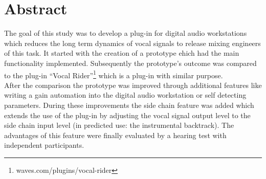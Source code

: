 \chapter*{Abstract}

The goal of this study was to develop a plug-in for digital audio workstations which reduces the long term dynamics of vocal signals to release mixing engineers of this task. It started with the creation of a prototype ehich had the main functionality implemented. Subsequently the prototype's outcome was compared to the plug-in “Vocal Rider”\footnote{waves.com/plugins/vocal-rider} which is a plug-in with similar purpose.\\
After the comparison the prototype was improved through additional features like writing a gain automation into the digital audio workstation or self detecting parameters. During these improvements the side chain feature was added which extends the use of the plug-in by adjusting the vocal signal output level to the side chain input level (in predicted use: the instrumental backtrack). The advantages of this feature were finally evaluated by a hearing test with independent participants.